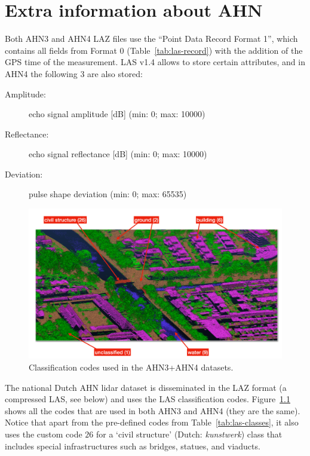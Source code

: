 
\graphicspath{{appendices/ahn/figs/}}

\chapter{Extra information about AHN}%
\label{app:ahn}



Both AHN3 and AHN4 LAZ files use the ``Point Data Record Format 1'', which contains all fields from Format 0 (Table~\ref{tab:las-record}) with the addition of the GPS time of the measurement.
LAS v1.4 allows to store certain attributes, and in AHN4 the following 3 are also stored:
\begin{description}
  \item[Amplitude:] echo signal amplitude [dB] (min: 0; max: 10000) 
  \item[Reflectance:] echo signal reflectance [dB] (min: 0; max: 10000)
  \item[Deviation:] pulse shape deviation (min: 0; max: 65535)
\end{description}

%

\begin{figure}
  \includegraphics[width=\linewidth]{ahn4.png}
  \caption{Classification codes used in the AHN3+AHN4 datasets.}%
\label{fig:ahn3}
\end{figure}
The national Dutch AHN lidar dataset 
is disseminated in the LAZ format (a compressed LAS, see below) and uses the LAS classification codes. 
Figure~\ref{fig:ahn3} shows all the codes that are used in both AHN3 and AHN4 (they are the same). 
Notice that apart from the pre-defined codes from Table~\ref{tab:las-classes}, it also uses the custom code $26$ for a `civil structure' (Dutch: \emph{kunstwerk}) class that includes special infrastructures such as bridges, statues, and viaducts. 

